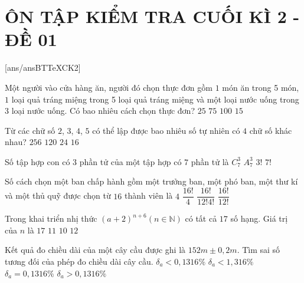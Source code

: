 \section*{ÔN TẬP KIỂM TRA CUỐI KÌ 2 - ĐỀ 01}
\setcounter{ex}{0}\setcounter{bt}{0}
[ans/ansBTTeXCK2]
\begin{ex}
 Một người vào cửa hàng ăn, người đó chọn thực đơn gồm $1$ món ăn trong 5 món, $1$ loại quả tráng miệng trong 5 loại quả tráng miệng và một loại nước uống trong 3 loại nước uống. Có bao nhiêu cách chọn thực đơn?
\choice
{$25$}
{\True $75$}
{$100$}
{$15$}
\end{ex}
\begin{ex}
 Từ các chữ số $2$, $3$, $4$, $5$ có thể lập được bao nhiêu số tự nhiên có $4$ chữ số khác nhau?
\choice
{$256$}
{$120$}
{\True $24$}
{$16$}
\end{ex}
\begin{ex}
 Số tập hợp con có $3$ phần tử của một tập hợp có $7$ phần tử là
\choice
{\True $C_7^3$}
{$A_7^3$}
{$3!$}
{$7!$}
\end{ex}
\begin{ex}
 Số cách chọn một ban chấp hành gồm một trưởng ban, một phó ban, một thư kí và một thủ quỹ được chọn từ $16$ thành viên là
\choice
{$4$}
{$\dfrac{16!}{4}$ }
{$\dfrac{16!}{12!4!}$ }
{\True $\dfrac{16!}{12!}$ }
\end{ex}
\begin{ex}
 Trong khai triển nhị thức $(a+2)^{n+6}(n\in \mathbb{N})$ có tất cả $17$ số hạng. Giá trị của $n$ là 
\choice
{$17$}
{$11$}
{\True $10$}
{$12$}
\end{ex}
\begin{ex}
 Kết quả đo chiều dài của một cây cầu được ghi là $152m\pm 0{,}2m$. Tìm sai số tương đối của phép đo chiều dài cây cầu.
\choice
{\True $\delta _a<0{,}1316\%$}
{$\delta _a<1{,}316\%$}
{$\delta _a=0{,}1316\%$}
{$\delta _a>0{,}1316\%$}
\end{ex}
